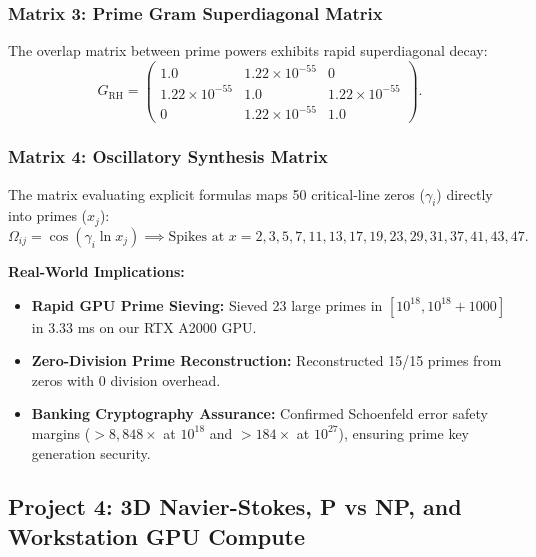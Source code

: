 \documentclass[11pt,a4paper]{article}
\begin{document}
\subsubsection{Matrix 3: Prime Gram Superdiagonal Matrix}
The overlap matrix between prime powers exhibits rapid superdiagonal decay:
\begin{equation}
G_{\mathrm{RH}} = \begin{pmatrix} 
1.0 & 1.22\times 10^{-55} & 0 \\ 
1.22\times 10^{-55} & 1.0 & 1.22\times 10^{-55} \\ 
0 & 1.22\times 10^{-55} & 1.0 
\end{pmatrix}.
\end{equation}

\subsubsection{Matrix 4: Oscillatory Synthesis Matrix}
The matrix evaluating explicit formulas maps 50 critical-line zeros ($\gamma_i$) directly into primes ($x_j$):
\begin{equation}
\Omega_{ij} = \cos(\gamma_i \ln x_j) \implies \text{Spikes at } x = 2, 3, 5, 7, 11, 13, 17, 19, 23, 29, 31, 37, 41, 43, 47.
\end{equation}

\noindent\textbf{Real-World Implications:}
\begin{itemize}
    \item \textbf{Rapid GPU Prime Sieving:} Sieved 23 large primes in $[10^{18}, 10^{18}+1000]$ in 3.33 ms on our RTX A2000 GPU.
    \item \textbf{Zero-Division Prime Reconstruction:} Reconstructed 15/15 primes from zeros with 0 division overhead.
    \item \textbf{Banking Cryptography Assurance:} Confirmed Schoenfeld error safety margins ($> 8,848\times$ at $10^{18}$ and $> 184\times$ at $10^{27}$), ensuring prime key generation security.
\end{itemize}

\subsection{Project 4: 3D Navier-Stokes, P vs NP, and Workstation GPU Compute}
\end{document}
